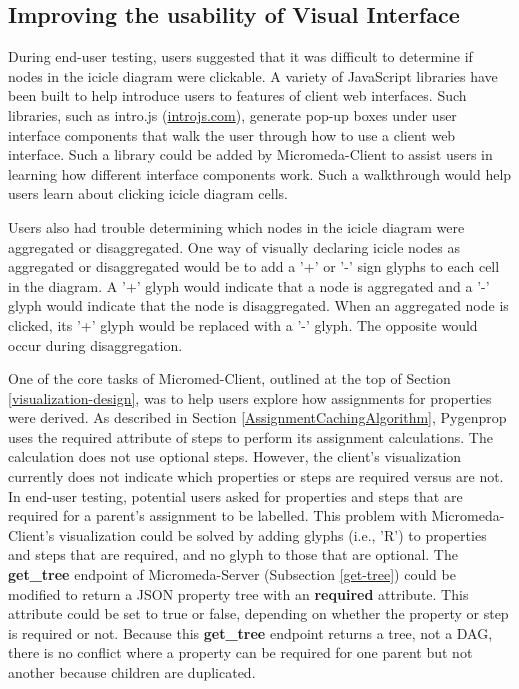\subsection{Improving the usability of Visual Interface}

During end-user testing, users suggested that it was difficult to determine if nodes in the icicle diagram were clickable. A variety of JavaScript libraries have been built to help introduce users to features of client web interfaces. Such libraries, such as intro.js \cite{mehrabani} (\href{introjs.com}{introjs.com}), generate pop-up boxes under user interface components that walk the user through how to use a client web interface. Such a library could be added by Micromeda-Client to assist users in learning how different interface components work. Such a walkthrough would help users learn about clicking icicle diagram cells.

Users also had trouble determining which nodes in the icicle diagram were aggregated or disaggregated. One way of visually declaring icicle nodes as aggregated or disaggregated would be to add a '+' or '-' sign glyphs to each cell in the diagram. A '+' glyph would indicate that a node is aggregated and a '-' glyph would indicate that the node is disaggregated. When an aggregated node is clicked, its '+' glyph would be replaced with a '-' glyph. The opposite would occur during disaggregation.

One of the core tasks of Micromed-Client, outlined at the top of Section \ref{visualization-design}, was to help users explore how assignments for properties were derived. As described in Section \ref{AssignmentCachingAlgorithm}, Pygenprop uses the required attribute of steps to perform its assignment calculations. The calculation does not use optional steps. However, the client's visualization currently does not indicate which properties or steps are required versus are not. In end-user testing, potential users asked for properties and steps that are required for a parent's assignment to be labelled. This problem with Micromeda-Client's visualization could be solved by adding glyphs (i.e., 'R') to properties and steps that are required, and no glyph to those that are optional. The \textbf{get\_tree} endpoint of Micromeda-Server (Subsection \ref{get-tree}) could be modified to return a JSON property tree with an \textbf{required} attribute. This attribute could be set to true or false, depending on whether the property or step is required or not. Because this \textbf{get\_tree} endpoint returns a tree, not a DAG, there is no conflict where a property can be required for one parent but not another because children are duplicated.

